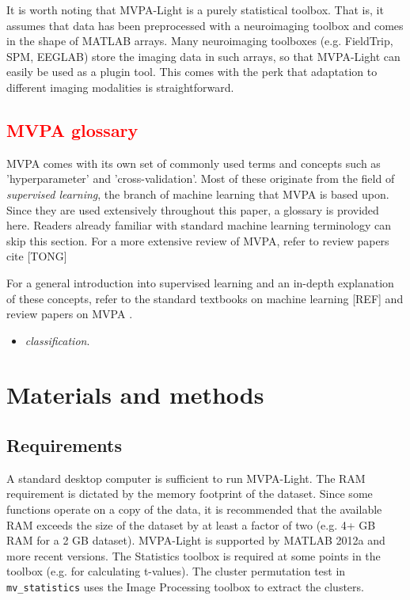 \documentclass[utf8]{frontiersSCNS} %
\newcommand{\ttt}[1]{\texttt{#1}}
\newcommand{\red}[1]{\textcolor{red}{#1}}
\begin{document}
It is worth noting that MVPA-Light is a purely statistical toolbox. That is, it assumes that data has been preprocessed with a neuroimaging toolbox and comes in the shape of MATLAB arrays. Many neuroimaging toolboxes (e.g. FieldTrip, SPM, EEGLAB) store the imaging  data in such arrays, so that MVPA-Light can easily be used as a plugin tool. This comes with the perk that adaptation to different imaging modalities is straightforward.

\subsection{\red{MVPA glossary}}

MVPA comes with its own set of commonly used terms and concepts such as 'hyperparameter' and
'cross-validation'. Most of these originate from the field of \textit{supervised learning}, the branch
of machine learning that MVPA is based upon. Since they are used extensively throughout this paper,
a glossary is provided here. Readers already familiar with standard machine learning terminology
can skip this section. For a more extensive review of MVPA, refer to review papers
cite [TONG]



For a general introduction into supervised learning and an in-depth explanation of these concepts,
refer to the standard textbooks on machine learning [REF] and review papers on MVPA \citep{Blankertz2011,Lemm2011,Mur2009,Grootswagers2017DecodingData,Pereira2009,Varoquaux2017}.


\begin{itemize}
\item \textit{classification}. 
\end{itemize}

\section{Materials and methods}

\subsection{Requirements}

A standard desktop computer is sufficient to run MVPA-Light. The RAM requirement is dictated by the memory footprint of the dataset. Since some functions operate on a copy of the data, it is recommended that the available RAM exceeds the size of the dataset by at least a factor of two (e.g. 4+ GB RAM for a 2 GB dataset). MVPA-Light is supported by MATLAB 2012a and more recent versions. The Statistics toolbox is required at some points in the toolbox (e.g. for calculating t-values). The cluster permutation test in \ttt{mv\_statistics} uses the Image Processing toolbox to extract the clusters.
\end{document}
